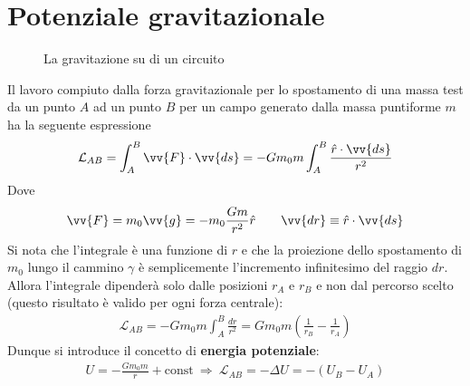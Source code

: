 \documentclass[a4paper, oneside]{book}
\begin{document}
\clearpage
\section{Potenziale gravitazionale}
\begin{figure}
    \centering
    \caption{La gravitazione su di un circuito}
\end{figure}
Il lavoro compiuto dalla forza gravitazionale per lo spostamento di una massa test
da un punto $A$ ad un punto $B$ per un campo generato dalla massa puntiforme $m$ 
ha la seguente espressione
\begin{align}
    \mathcal{L}_{AB} = \int_{A}^{B} \vv{F}\cdot \vv{ds}   = -Gm_0 m \int_{A}^{B} \frac{\hat{r}\cdot \vv{ds}  }{r^{2}} 
\end{align}
Dove
\begin{gather*}
    \vv{F} = m_0 \vv{g} = - m_0\frac{Gm}{r^{2}}\hat{r }   \qquad \vv{dr} \equiv \hat{r} \cdot \vv{ds}    
\end{gather*}
Si nota che l'integrale è una funzione di $r$ e che la proiezione dello spostamento di 
$m_0$ lungo il cammino $\gamma$ è semplicemente l'incremento infinitesimo del 
raggio $dr$. Allora l'integrale dipenderà solo dalle posizioni $r_A$ e $r_B$ e
non dal percorso scelto (questo risultato è valido per ogni forza centrale):
\begin{align}
    \mathcal{L}_{AB} = - Gm_0m \int_{A}^{B} \frac{dr}{r^{2}} = Gm_0m\left(\frac{1}{r_B} - \frac{1}{r_A}\right) 
\end{align}
Dunque si introduce il concetto di \textbf{energia potenziale}:
\begin{align}
    \boxed{U = -\frac{Gm_0 m}{r} +\text{const}} \ \Longrightarrow \ \mathcal{L}_{AB} = - \Delta U = -(U_B - U_A)
\end{align}
\end{document}
